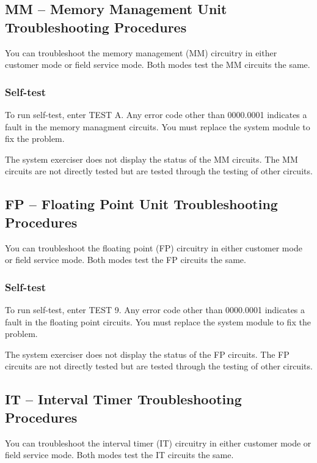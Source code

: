 \subsection{MM -- Memory Management Unit Troubleshooting Procedures}

You can troubleshoot the memory management (MM) circuitry in either
customer mode or field service mode. Both modes test the MM circuits the
same.


\subsubsection{Self-test}

To run self-test, enter TEST A. Any error code other than 0000.0001 
indicates a fault in the memory managment circuits. You must replace the
system module to fix the problem.

The system exerciser does not display the status of the MM circuits. The
MM circuits are not directly tested but are tested through the testing of other
circuits.

\subsection{FP -- Floating Point Unit Troubleshooting Procedures}

You can troubleshoot the floating point (FP) circuitry in either customer
mode or field service mode. Both modes test the FP circuits the same.

\subsubsection{Self-test}

To run self-test, enter TEST 9. Any error code other than 0000.0001 indicates
a fault in the floating point circuits. You must replace the system module
to fix the problem.

The system exerciser does not display the status of the FP circuits. The FP
circuits are not directly tested but are tested through the testing of other
circuits.

\subsection{IT -- Interval Timer Troubleshooting Procedures}

You can troubleshoot the interval timer (IT) circuitry in either customer
mode or field service mode. Both modes test the IT circuits the same.


